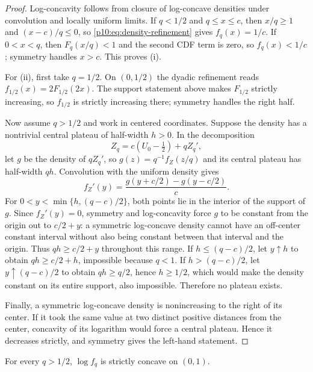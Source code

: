 \documentclass[11pt]{article}
\numberwithin{equation}{section}
\theoremstyle{definition}
\theoremstyle{remark}
\begin{document}
\begin{proof}
Log-concavity follows from closure of log-concave densities under convolution and locally
uniform limits.  If $q<1/2$ and $q\le x\le c$, then $x/q\ge1$ and $(x-c)/q\le0$, so
\eqref{p10:eq:density-refinement} gives $f_q(x)=1/c$.  If $0<x<q$, then
$F_q(x/q)<1$ and the second CDF term is zero, so $f_q(x)<1/c$; symmetry handles $x>c$.
This proves (i).

For (ii), first take $q=1/2$.  On $(0,1/2)$ the dyadic refinement reads
$f_{1/2}(x)=2F_{1/2}(2x)$.  The support statement above makes $F_{1/2}$ strictly increasing,
so $f_{1/2}$ is strictly increasing there; symmetry handles the right half.

Now assume $q>1/2$ and work in centered coordinates.  Suppose the density has a nontrivial
central plateau of half-width $h>0$.  In the decomposition
\[
 Z_q=c(U_0-\tfrac12)+qZ_q',
\]
let $g$ be the density of $qZ_q'$, so $g(z)=q^{-1}f_Z(z/q)$ and its central plateau has
half-width $qh$.  Convolution with the uniform density gives
\begin{equation}
 f_Z'(y)=\frac{g(y+c/2)-g(y-c/2)}{c}.                         \label{p10:eq:plateau-derivative}
\end{equation}
For $0<y<\min\{h,(q-c)/2\}$, both points lie in the interior of the support of $g$.
Since $f_Z'(y)=0$, symmetry and log-concavity force $g$ to be constant from the origin out to
$c/2+y$: a symmetric log-concave density cannot have an off-center constant interval without
also being constant between that interval and the origin.  Thus $qh\ge c/2+y$ throughout
this range.  If $h\le(q-c)/2$, let $y\uparrow h$ to obtain $qh\ge c/2+h$, impossible because
$q<1$.  If $h>(q-c)/2$, let $y\uparrow(q-c)/2$ to obtain $qh\ge q/2$, hence $h\ge1/2$, which
would make the density constant on its entire support, also impossible.  Therefore no
plateau exists.

Finally, a symmetric log-concave density is nonincreasing to the right of its center.  If it
took the same value at two distinct positive distances from the center, concavity of its
logarithm would force a central plateau.  Hence it decreases strictly, and symmetry gives the
left-hand statement.
\end{proof}

\begin{conjecture}
\label{p10:conj:strict-logconcavity}
For every $q>1/2$, $\log f_q$ is strictly concave on $(0,1)$.
\end{conjecture}
\end{document}
